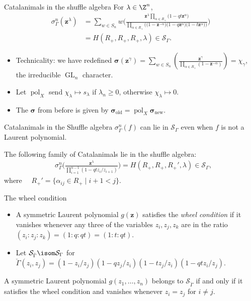 \documentclass[dvipsnames]{beamer}
\newcommand{\zz}{{\boldsymbol z}}
\newcommand{\sigmabold}{\boldsymbol \sigma}
\DeclareMathOperator{\pol}{pol}
\DeclareMathOperator{\GL}{GL}
\newcommand{\Scal}{\mathcal{S}}
\newcommand{\tGamma}{{\check{\Gamma}}} %
\theoremstyle{definition}
\begin{document}
\begin{frame}{Catalanimals in the shuffle algebra}
  For  $\lambda \in \Z^n$,
\vspace{-3mm}
\begin{align*}
\sigma_\Gamma^n(\zz^\lambda) &=
\sum_{w \in S_n} w\bigg(\frac{\zz ^\lambda \prod_{\alpha \in R_+}
\big(1-q t \zz ^\alpha \big)}
{\prod_{\alpha \in R_+}\big(\big(1-\zz ^{-\alpha}\big) \big(1-q  \zz ^\alpha\big)
 \big(1-t \zz ^\alpha\big)\big)}
\bigg)
 \\
&= H(R_+,R_+,R_+,\lambda)  \in \Scal_\Gamma.
\end{align*}
\begin{itemize}
\item Technicality: we have redefined
  \(\sigmabold(\zz^\gamma) = \sum_{w \in S_n}\left(
    \frac{\zz^\gamma}{\prod_{\alpha\in R_+}(1-\zz^{-\alpha})} \right)
  = \chi_\gamma\), the irreducible \(\GL_n\) character.
  \item Let \(\pol_X\) send \(\chi_\lambda \mapsto s_\lambda\) if
    \(\lambda_n \geq 0\), otherwise \(\chi_\lambda \mapsto 0\).
  \item The \(\sigmabold\) from before is given by
  \(\sigmabold_{\text{old}} = \pol_X \sigmabold_{\text{new}}\).
\end{itemize}
\end{frame}
\begin{frame}{Catalanimals in the Shuffle algebra}
 $\sigma_\Gamma^n(f)$ can lie in  $\Scal_\Gamma$ even when  $f$ is not a Laurent polynomial.
\begin{theorem}[Negut]
The following family of Catalanimals lie in the shuffle algebra:
\vspace{-3mm}
\begin{align*}
& \sigma_\Gamma^n\Big(\frac{\zz^\lambda}{\prod_{i=1}^{n-1} (1-qt z_i/z_{i+1}) }\Big)
= H(R_+,R_+,R_+',\lambda) \in \Scal_\Gamma,
\end{align*}
where  \ \, $R_+' = \{ \alpha_{ij} \in R_+ \mid i+1 < j \}.$
\end{theorem}
\end{frame}
\begin{frame}{The wheel condition}
  \begin{itemize}
  \item A symmetric Laurent polynomial \(g(\zz)\) satisfies the
    \emph{wheel condition} if it vanishes whenever any three of the
    variables \(z_i,z_j,z_k\) are in the ratio
    \((z_i:z_j:z_k) = (1:q:qt) =
    (1:t:qt)\).
    \item Let \(\Scal_{\tGamma} \isom \Scal_\Gamma\) for
    \(\tGamma(z_i,z_j) = (1-z_i/z_j)(1-q z_j/z_i)(1-t z_j/z_i)(1 - qt
    z_i/z_j)\).
  \end{itemize}
\begin{theorem}[Negut]
A symmetric Laurent polynomial $g(z_{1},\ldots,z_{n})$ belongs to
$\Scal _{\tGamma }$ if and only if it satisfies the wheel
condition and vanishes whenever $z_{i} = z_{j}$ for $i\not =j$.
\end{theorem}
\end{frame}
\end{document}

